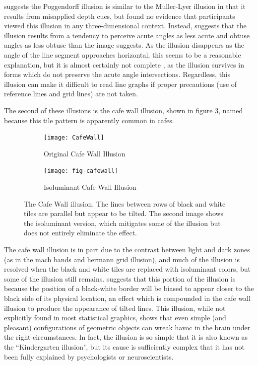 \documentclass[11pt]{isuthesis}\usepackage[]{graphicx}\usepackage[]{color}
\begin{document}
\citet{gregory1963distortion, gregory1997knowledge} suggests the Poggendorff illusion is similar to the Muller-Lyer illusion in that it results from misapplied depth cues, but \citet{green1963poggendorff, ward1977case} found no evidence that participants viewed this illusion in any three-dimensional context. Instead, \citet{green1963poggendorff} suggests that the illusion results from a tendency to perceive acute angles as less acute and obtuse angles as less obtuse than the image suggests. As the illusion disappears as the angle of the line segment approaches horizontal, this seems to be a reasonable explanation, but it is almost certainly not complete \citep{morgan1999poggendorff}, as the illusion survives in forms which do not preserve the acute angle intersections. Regardless, this illusion can make it difficult to read line graphs \citep{amer2005bias, poulton1985geometric} if proper precautions (use of reference lines and grid lines) are not taken.

The second of these illusions is the cafe wall illusion, shown in figure \ref{fig:cafewall}, named because this tile pattern is apparently common in cafes. 



\begin{figure}[htbp]\centering
\hfil
\begin{subfigure}[b]{.4\linewidth}\centering
  \texttt{[image: CafeWall]}
  \caption{Original Cafe Wall Illusion}\label{fig:CafeWallOrig}
\end{subfigure}\hfil
\begin{subfigure}[b]{.4\linewidth}\centering
  \texttt{[image: fig-cafewall]}
  \caption{Isoluminant Cafe Wall Illusion}\label{fig:CafeWallIso}
\end{subfigure}\hfil
\caption[Cafe Wall Illusion]{The Cafe Wall illusion. The lines between rows of black and white tiles are parallel but appear to be tilted. The second image shows the isoluminant version, which mitigates some of the illusion but does not entirely eliminate the effect.}\label{fig:cafewall}
\end{figure}

The cafe wall illusion is in part due to the contrast between light and dark zones (as in the mach bands and hermann grid illusion), and much of the illusion is resolved when the black and white tiles are replaced with isoluminant colors, but some of the illusion still remains. \citet{westheimer2007irradiation} suggests that this portion of the illusion is because the position of a black-white border will be biased to appear closer to the black side of its physical location, an effect which is compounded in the cafe wall illusion to produce the appearance of tilted lines. This illusion, while not explicitly found in most statistical graphics, shows that even simple (and pleasant) configurations of geometric objects can wreak havoc in the brain under the right circumstances. In fact, the illusion is so simple that it is also known as the ``Kindergarten illusion", but its cause is sufficiently complex that it has not been fully explained by psychologists or neuroscientists. 
\end{document}

